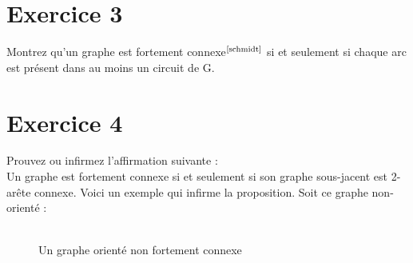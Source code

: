 \documentclass{article}      %
\begin{document}
\section{Exercice 3}
\textcolor{exogris}{
Montrez qu’un graphe est fortement connexe$^\text{\cite{schmidt}}$ si et seulement si chaque arc est présent dans au moins un circuit de G.
}



\section{Exercice 4}
\textcolor{exogris}{
Prouvez ou infirmez l’affirmation suivante :
\\Un graphe est fortement connexe si et seulement si son graphe sous-jacent est 2-arête connexe.
}
Voici un exemple qui infirme la proposition.
Soit ce graphe non-orienté :

\begin{figure}[H]
    \centering
    \\Un graphe orienté non fortement connexe
\end{figure}
\end{document}
